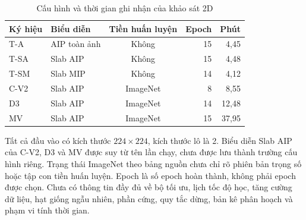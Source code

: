 \documentclass[14pt,a4paper,oneside]{extreport}
\begin{document}
\begin{table}[htbp]
  \centering
  \caption{Cấu hình và thời gian ghi nhận của khảo sát 2D}
  \label{tab:sweep-2d-training}
  \begin{tabular}{@{}llcrr@{}}
    \toprule
    Ký hiệu & Biểu diễn & Tiền huấn luyện & Epoch & Phút\\
    \midrule
    T-A  & AIP toàn ảnh & Không & 15 & 4,45\\
    T-SA & Slab AIP & Không & 15 & 4,48\\
    T-SM & Slab MIP & Không & 14 & 4,12\\
    C-V2 & Slab AIP & ImageNet & 8 & 8,55\\
    D3   & Slab AIP & ImageNet & 14 & 12,48\\
    MV   & Slab AIP & ImageNet & 15 & 37,95\\
    \bottomrule
  \end{tabular}
\end{table}
Tất cả đầu vào có kích thước $224\times224$, kích thước lô là 2. Biểu diễn
Slab AIP của C-V2, D3 và MV được suy từ tên lần chạy, chưa được lưu thành
trường cấu hình riêng. Trạng thái ImageNet theo bảng nguồn chưa chỉ
rõ phiên bản trọng số hoặc tập con tiền huấn luyện. Epoch là số epoch
hoàn thành, không phải epoch được chọn. Chưa có thông tin đầy đủ về
bộ tối ưu, lịch tốc độ học, tăng cường dữ liệu, hạt giống ngẫu nhiên, phần cứng,
quy tắc dừng, bản kê phân hoạch và phạm vi tính thời gian.
\FloatBarrier
\end{document}
